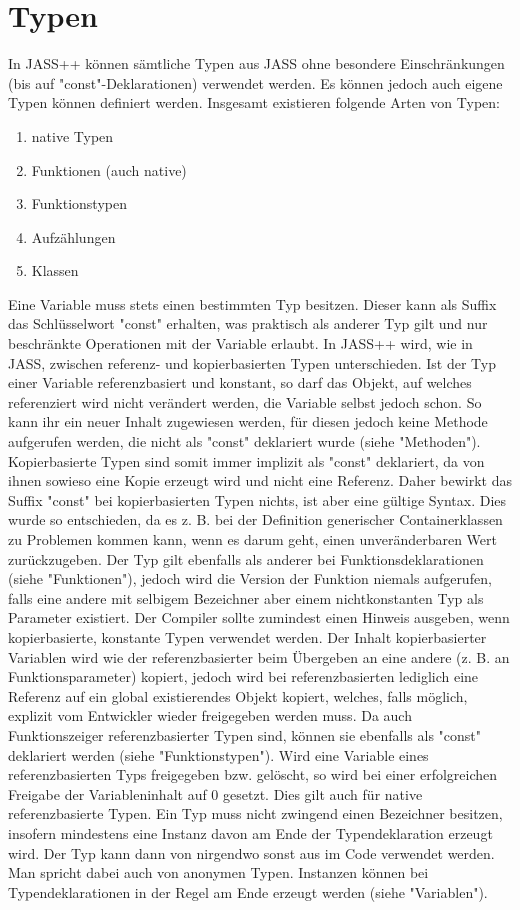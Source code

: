 \chapter{Typen}

In JASS++ können sämtliche Typen aus JASS ohne besondere Einschränkungen (bis auf "const"-Deklarationen) verwendet werden.
Es können jedoch auch eigene Typen können definiert werden. Insgesamt existieren folgende Arten von Typen:
\begin{enumerate}
\item native Typen
\item Funktionen (auch native)
\item Funktionstypen
\item Aufzählungen
\item Klassen
\end{enumerate}
Eine Variable muss stets einen bestimmten Typ besitzen. Dieser kann als Suffix das Schlüsselwort "const" erhalten, was praktisch als
anderer Typ gilt und nur beschränkte Operationen mit der Variable erlaubt.
In JASS++ wird, wie in JASS, zwischen referenz- und kopierbasierten Typen unterschieden. Ist der Typ einer Variable
referenzbasiert und konstant, so darf das Objekt, auf welches referenziert wird nicht verändert werden, die Variable selbst jedoch schon.
So kann ihr ein neuer Inhalt zugewiesen werden, für diesen jedoch keine Methode aufgerufen werden, die nicht als "const" deklariert wurde (siehe "Methoden").
Kopierbasierte Typen sind somit immer implizit als "const" deklariert, da von ihnen sowieso eine Kopie erzeugt wird und nicht eine Referenz.
Daher bewirkt das Suffix "const" bei kopierbasierten Typen nichts, ist aber eine gültige Syntax.
Dies wurde so entschieden, da es z. B. bei der Definition generischer Containerklassen zu Problemen kommen kann, wenn es darum geht, einen
unveränderbaren Wert zurückzugeben.
Der Typ gilt ebenfalls als anderer bei Funktionsdeklarationen (siehe "Funktionen"), jedoch wird die Version der Funktion niemals aufgerufen, falls eine andere
mit selbigem Bezeichner aber einem nichtkonstanten Typ als Parameter existiert. Der Compiler sollte zumindest einen Hinweis ausgeben, wenn
kopierbasierte, konstante Typen verwendet werden.
Der Inhalt kopierbasierter Variablen wird wie der referenzbasierter beim Übergeben an eine andere (z. B. an Funktionsparameter) kopiert,
jedoch wird bei referenzbasierten lediglich eine Referenz auf ein global existierendes Objekt kopiert, welches, falls möglich,
explizit vom Entwickler wieder freigegeben werden muss.
Da auch Funktionszeiger referenzbasierter Typen sind, können sie ebenfalls als "const" deklariert werden (siehe "Funktionstypen").
Wird eine Variable eines referenzbasierten Typs freigegeben bzw. gelöscht, so wird bei einer erfolgreichen Freigabe der Variableninhalt auf 0
gesetzt.
Dies gilt auch für native referenzbasierte Typen.
Ein Typ muss nicht zwingend einen Bezeichner besitzen, insofern mindestens eine Instanz davon am Ende der Typendeklaration erzeugt wird.
Der Typ kann dann von nirgendwo sonst aus im Code verwendet werden. Man spricht dabei auch von anonymen Typen. Instanzen können bei
Typendeklarationen in der Regel am Ende erzeugt werden (siehe "Variablen").

